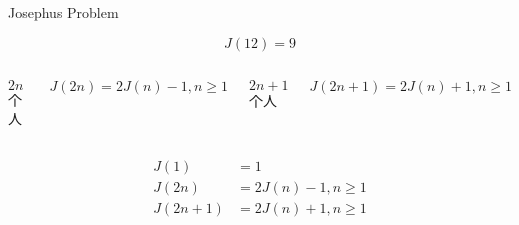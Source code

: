 %

\begin{frame}{}
  \begin{exampleblock}{Josephus Problem}

    \[
      J(12) = 9
    \]
  \end{exampleblock}
\end{frame}

\begin{frame}{}
  \begin{columns}
      \begin{center}
        $2n$ 个人
      \end{center}

      \pause
      \[
        J(2n) = 2J(n) - 1, n \ge 1
      \]
      \pause
      \begin{center}
        $2n + 1$ 个人
      \end{center}

      \pause
      \[
        J(2n + 1) = 2J(n) + 1, n \ge 1
      \]
  \end{columns}
\end{frame}

\begin{frame}{}
  \begin{align*}
    J(1) &= 1 \\[8pt]
    J(2n) &= 2J(n) - 1, n \ge 1 \\[8pt]
    J(2n + 1) &= 2J(n) + 1, n \ge 1
  \end{align*}

  \pause
  \begin{columns}
  \end{columns}
\end{frame}
